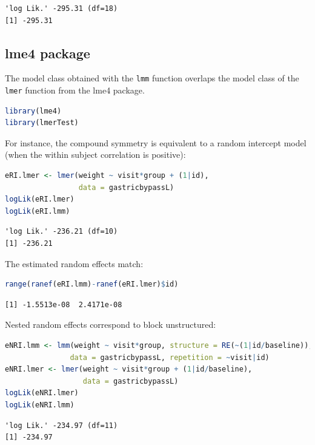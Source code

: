 \documentclass[12pt]{article}
\begin{document}
\label{}
\begin{verbatim}
'log Lik.' -295.31 (df=18)
[1] -295.31
\end{verbatim}


\clearpage
\subsection{lme4 package}
\label{sec:org1410d51}

The model class obtained with the \texttt{lmm} function overlaps the model
class of the \texttt{lmer} function from the lme4 package.
\begin{lstlisting}[language=r,numbers=none]
library(lme4)
library(lmerTest)
\end{lstlisting}

For instance, the compound symmetry is equivalent to a random
intercept model (when the within subject correlation is positive):
\begin{lstlisting}[language=r,numbers=none]
eRI.lmer <- lmer(weight ~ visit*group + (1|id),
                 data = gastricbypassL)
logLik(eRI.lmer)
logLik(eRI.lmm)
\end{lstlisting}

\label{}
\begin{verbatim}
'log Lik.' -236.21 (df=10)
[1] -236.21
\end{verbatim}


The estimated random effects match:
\begin{lstlisting}[language=r,numbers=none]
range(ranef(eRI.lmm)-ranef(eRI.lmer)$id)
\end{lstlisting}

\label{}
\begin{verbatim}
[1] -1.5513e-08  2.4171e-08
\end{verbatim}


Nested random effects correspond to block unstructured:
\begin{lstlisting}[language=r,numbers=none]
eNRI.lmm <- lmm(weight ~ visit*group, structure = RE(~(1|id/baseline)),
               data = gastricbypassL, repetition = ~visit|id)
eNRI.lmer <- lmer(weight ~ visit*group + (1|id/baseline),
                  data = gastricbypassL)
logLik(eNRI.lmer)
logLik(eNRI.lmm)
\end{lstlisting}

\label{}
\begin{verbatim}
'log Lik.' -234.97 (df=11)
[1] -234.97
\end{verbatim}
\end{document}
